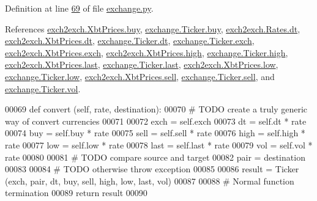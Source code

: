 Definition at line \hyperlink{exchange_8py_source_l00069}{69} of file \hyperlink{exchange_8py_source}{exchange.\+py}.



References \hyperlink{exch2exch_8py_source_l00059}{exch2exch.\+Xbt\+Prices.\+buy}, \hyperlink{exchange_8py_source_l00060}{exchange.\+Ticker.\+buy}, \hyperlink{exch2exch_8py_source_l00028}{exch2exch.\+Rates.\+dt}, \hyperlink{exch2exch_8py_source_l00057}{exch2exch.\+Xbt\+Prices.\+dt}, \hyperlink{exchange_8py_source_l00059}{exchange.\+Ticker.\+dt}, \hyperlink{exchange_8py_source_l00057}{exchange.\+Ticker.\+exch}, \hyperlink{exch2exch_8py_source_l00064}{exch2exch.\+Xbt\+Prices.\+exch}, \hyperlink{exch2exch_8py_source_l00061}{exch2exch.\+Xbt\+Prices.\+high}, \hyperlink{exchange_8py_source_l00062}{exchange.\+Ticker.\+high}, \hyperlink{exch2exch_8py_source_l00063}{exch2exch.\+Xbt\+Prices.\+last}, \hyperlink{exchange_8py_source_l00064}{exchange.\+Ticker.\+last}, \hyperlink{exch2exch_8py_source_l00062}{exch2exch.\+Xbt\+Prices.\+low}, \hyperlink{exchange_8py_source_l00063}{exchange.\+Ticker.\+low}, \hyperlink{exch2exch_8py_source_l00058}{exch2exch.\+Xbt\+Prices.\+sell}, \hyperlink{exchange_8py_source_l00061}{exchange.\+Ticker.\+sell}, and \hyperlink{exchange_8py_source_l00065}{exchange.\+Ticker.\+vol}.


\begin{DoxyCode}
00069     \textcolor{keyword}{def }convert (self, rate, destination):
00070         \textcolor{comment}{# TODO create a truly generic way of convert currencies}
00071     
00072         exch = self.exch
00073         dt   = self.dt   * rate
00074         buy  = self.buy  * rate
00075         sell = self.sell * rate
00076         high = self.high * rate
00077         low  = self.low  * rate
00078         last = self.last * rate
00079         vol  = self.vol  * rate
00080 
00081         \textcolor{comment}{# TODO compare source and target}
00082         pair = destination
00083         
00084         \textcolor{comment}{# TODO otherwise throw exception }
00085         
00086         result = Ticker (exch, pair, dt, buy, sell, high, low, last, vol)
00087         
00088         \textcolor{comment}{# Normal function termination}
00089         \textcolor{keywordflow}{return} result 
00090         
\end{DoxyCode}
\mbox{\label{classexchange_1_1_ticker_a53148d54a0b9b577870db785fb4e381e}} 
